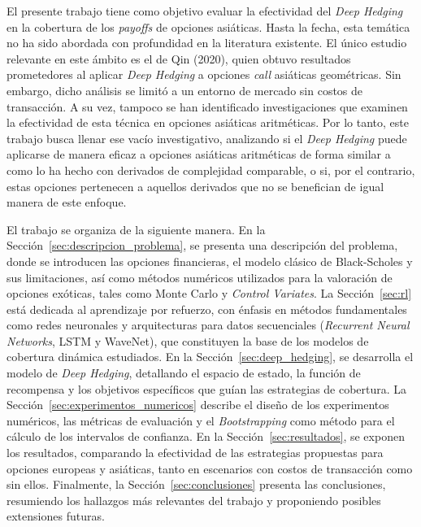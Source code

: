 \documentclass[11pt,a4paper,spanish]{article}
\numberwithin{equation}{section} %
\begin{document}
El presente trabajo tiene como objetivo evaluar la efectividad del \textit{Deep Hedging} en la cobertura de los \textit{payoffs} de opciones asiáticas. Hasta la fecha, esta temática no ha sido abordada con profundidad en la literatura existente. El único estudio relevante en este ámbito es el de Qin (2020), quien obtuvo resultados prometedores al aplicar \textit{Deep Hedging} a opciones \textit{call} asiáticas geométricas. Sin embargo, dicho análisis se limitó a un entorno de mercado sin costos de transacción. A su vez, tampoco se han identificado investigaciones que examinen la efectividad de esta técnica en opciones asiáticas aritméticas. Por lo tanto, este trabajo busca llenar ese vacío investigativo, analizando si el \textit{Deep Hedging} puede aplicarse de manera eficaz a opciones asiáticas aritméticas de forma similar a como lo ha hecho con derivados de complejidad comparable, o si, por el contrario, estas opciones pertenecen a aquellos derivados que no se benefician de igual manera de este enfoque.

El trabajo se organiza de la siguiente manera. En la Sección~\ref{sec:descripcion_problema}, se presenta una descripción del problema, donde se introducen las opciones financieras, el modelo clásico de Black-Scholes y sus limitaciones, así como métodos numéricos utilizados para la valoración de opciones exóticas, tales como Monte Carlo y \textit{Control Variates}. La Sección~\ref{sec:rl} está dedicada al aprendizaje por refuerzo, con énfasis en métodos fundamentales como redes neuronales y arquitecturas para datos secuenciales (\textit{Recurrent Neural Networks}, LSTM y WaveNet), que constituyen la base de los modelos de cobertura dinámica estudiados. En la Sección~\ref{sec:deep_hedging}, se desarrolla el modelo de \textit{Deep Hedging}, detallando el espacio de estado, la función de recompensa y los objetivos específicos que guían las estrategias de cobertura. La Sección~\ref{sec:experimentos_numericos} describe el diseño de los experimentos numéricos, las métricas de evaluación y el \textit{Bootstrapping} como método para el cálculo de los intervalos de confianza. En la Sección~\ref{sec:resultados}, se exponen los resultados, comparando la efectividad de las estrategias propuestas para opciones europeas y asiáticas, tanto en escenarios con costos de transacción como sin ellos. Finalmente, la Sección~\ref{sec:conclusiones} presenta las conclusiones, resumiendo los hallazgos más relevantes del trabajo y proponiendo posibles extensiones futuras.

\newpage
\end{document}

